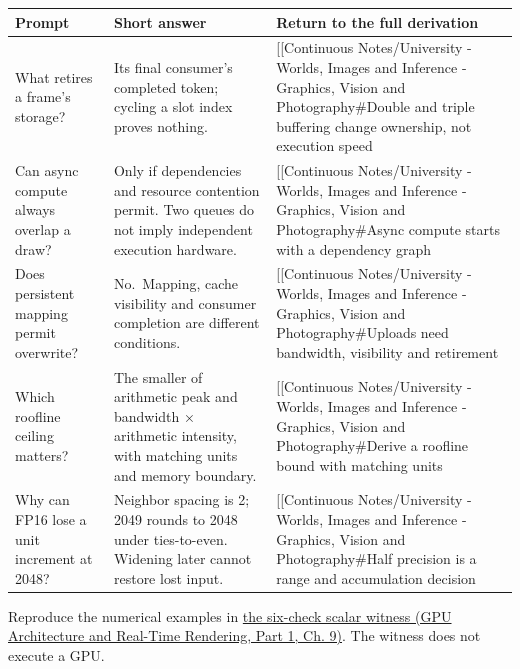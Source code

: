\hypertarget{appendix-a8f634b076b5-buffering-budget-and-precision-in-five-answers}{}

{\def\LTcaptype{none} %
\begin{longtable}[]{@{}
  >{\raggedright\arraybackslash}p{}
  >{\raggedright\arraybackslash}p{}
  >{\raggedright\arraybackslash}p{}@{}}
\toprule\noalign{}
\begin{minipage}[b]{\linewidth}\raggedright
Prompt
\end{minipage} & \begin{minipage}[b]{\linewidth}\raggedright
Short answer
\end{minipage} & \begin{minipage}[b]{\linewidth}\raggedright
Return to the full derivation
\end{minipage} \\
\midrule\noalign{}
\endhead
\bottomrule\noalign{}
\endlastfoot
What retires a frame's storage? & Its final consumer's completed token; cycling a slot index proves nothing. & {[}{[}Continuous Notes/University - Worlds, Images and Inference - Graphics, Vision and Photography\#Double and triple buffering change ownership, not execution speed \\
Can async compute always overlap a draw? & Only if dependencies and resource contention permit. Two queues do not imply independent execution hardware. & {[}{[}Continuous Notes/University - Worlds, Images and Inference - Graphics, Vision and Photography\#Async compute starts with a dependency graph \\
Does persistent mapping permit overwrite? & No.~Mapping, cache visibility and consumer completion are different conditions. & {[}{[}Continuous Notes/University - Worlds, Images and Inference - Graphics, Vision and Photography\#Uploads need bandwidth, visibility and retirement \\
Which roofline ceiling matters? & The smaller of arithmetic peak and bandwidth × arithmetic intensity, with matching units and memory boundary. & {[}{[}Continuous Notes/University - Worlds, Images and Inference - Graphics, Vision and Photography\#Derive a roofline bound with matching units \\
Why can FP16 lose a unit increment at 2048? & Neighbor spacing is 2; 2049 rounds to 2048 under ties-to-even. Widening later cannot restore lost input. & {[}{[}Continuous Notes/University - Worlds, Images and Inference - Graphics, Vision and Photography\#Half precision is a range and accumulation decision \\
\end{longtable}
}

Reproduce the numerical examples in \href{../06-GPU-Architecture-and-Real-Time-Rendering-P01/main.pdf\#03-visual-computing-i-ch016-check-the-scheduling-and-precision-examples-with-a-scalar-witness}{the six-check scalar witness (GPU Architecture and Real-Time Rendering, Part 1, Ch. 9)}. The witness does not execute a GPU.
